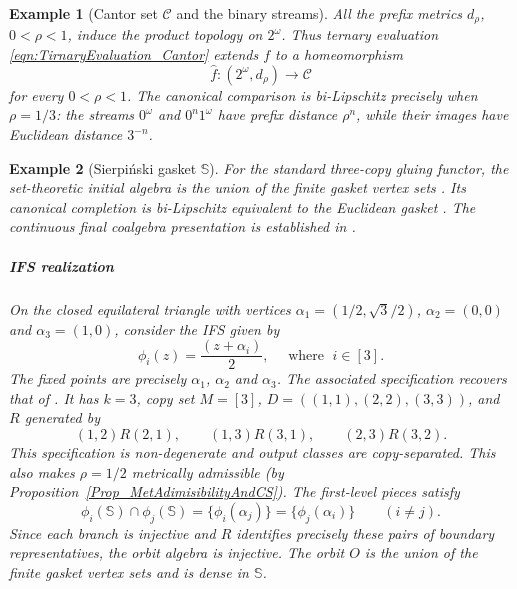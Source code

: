 \documentclass{sn-jnl}%
\theoremstyle{thmstyleone}%
\theoremstyle{thmstyletwo}%
\newtheorem{example}{Example}%
\theoremstyle{thmstylethree}%
\newcommand{\f}{\phi}
\newcommand{\Ss}{\mathbb{S}}
\begin{document}
\begin{example}[Cantor set $\mathcal C$ and the binary streams]
    All the prefix metrics $d_\rho$, $0<\rho<1$, induce the     product topology on $2^\omega$. Thus ternary evaluation     \eqref{eqn:TirnaryEvaluation_Cantor} extends $f$ to a homeomorphism
    \begin{equation} 
    \nonumber
        \widehat f:(2^\omega,d_\rho)\longrightarrow\mathcal C
    \end{equation}
    for every $0<\rho<1$. The canonical comparison is bi-Lipschitz precisely when $\rho=1/3$: the streams $0^\omega$ and $0^n1^\omega$ have prefix distance $\rho^n$, while their images have Euclidean distance $3^{-n}$.
\end{example}

\begin{example}[Sierpiński gasket $\Ss$]
\label{Ex_Sierpinski}
    For the standard three-copy gluing functor, the set-theoretic initial algebra is the union of the finite gasket vertex sets \cite[Proposition 4.2]{Sierpinski_gasket}. Its canonical completion is bi-Lipschitz equivalent to the Euclidean gasket \cite{Bhat,Sierpinski_gasket}. The continuous final coalgebra presentation is established in \cite[Theorem 4.4]{Sierpinski_gasket}.
    
    \subparagraph{IFS realization} On the closed equilateral triangle with vertices $\alpha_1=(1/2,\sqrt3/2)$,  $\alpha_2=(0,0)$ and $\alpha_3=(1,0)$,  consider the IFS given by 
    \begin{equation} 
    \nonumber
        \f_i(z)=\frac{(z+\alpha_i)}{2}, \quad \text{ where } \; i\in[3].
    \end{equation}
    The fixed points are precisely $\alpha_1$, $\alpha_2$ and $\alpha_3$. The associated specification recovers that of \cite{Sierpinski_gasket}. It has $k=3$, copy set $M=[3]$, $D=((1,1),(2,2),(3,3))$, and $R$ generated by
    \begin{equation} 
    \nonumber
        (1,2)R(2,1),\qquad (1,3)R(3,1),\qquad (2,3)R(3,2).
    \end{equation}
    This specification is non-degenerate and output classes are copy-separated. This also makes $\rho=1/2$ metrically admissible (by Proposition~\ref{Prop_MetAdimisibilityAndCS}). The first-level pieces satisfy
    \begin{equation} 
    \nonumber
        \f_i(\Ss)\cap\f_j(\Ss) = \{\f_i(\alpha_j)\} = \{\f_j(\alpha_i)\}      \qquad (i\ne j).
    \end{equation}
    Since each branch is injective and $R$ identifies precisely these pairs of boundary representatives, the orbit algebra is injective. The orbit $O$ is the union of the finite gasket vertex sets and is dense in $\Ss$.
    

\end{example}
\end{document}
